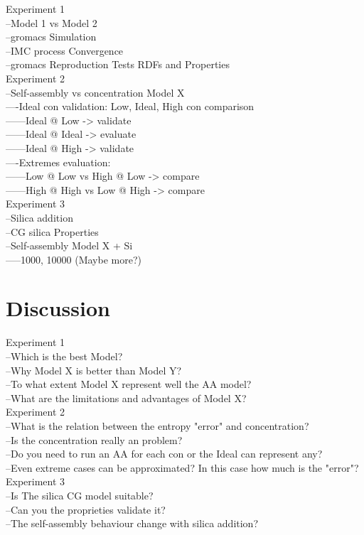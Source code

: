 \documentclass[10pt,a4paper,twoside]{article}
\begin{document}
Experiment 1\\
 --Model 1 vs Model 2 \\
 --gromacs Simulation\\
 --IMC process Convergence\\
 --gromacs Reproduction Tests RDFs and Properties\\
Experiment 2\\
 --Self-assembly vs concentration Model X\\
  ----Ideal con validation: Low, Ideal, High con comparison\\
   ------Ideal @ Low -> validate\\
   ------Ideal @ Ideal -> evaluate\\
   ------Ideal @ High -> validate\\
  ----Extremes evaluation:\\
  ------Low @ Low vs High @ Low -> compare\\
   ------High @ High vs Low @ High -> compare\\
Experiment 3\\
 --Silica addition\\
  --CG silica Properties \\
  --Self-assembly Model X + Si\\
   -----1000, 10000 (Maybe more?)\\

\section{Discussion}


Experiment 1\\
 --Which is the best Model?\\
 --Why Model X is better than Model Y?\\
 --To what extent Model X represent well the AA model?\\
 --What are the limitations and advantages of Model X?\\
Experiment 2\\
 --What is the relation between the entropy "error" and concentration? \\
 --Is the concentration really an problem?\\
 --Do you need to run an AA for each con or the Ideal can represent any?\\
 --Even extreme cases can be approximated? In this case how much is the "error"?\\
Experiment 3\\
 --Is The silica CG model suitable? \\
 --Can you the proprieties validate it?\\
 --The self-assembly behaviour change with silica addition?\\
\end{document}
